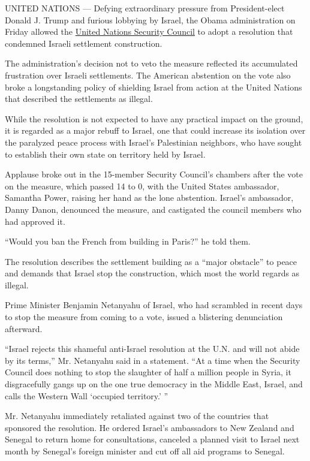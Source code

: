 UNITED NATIONS --- Defying extraordinary pressure from President-elect
Donald J. Trump and furious lobbying by Israel, the Obama administration
on Friday allowed the \href{http://www.un.org/en/sc/}{United Nations
Security Council} to adopt a resolution that condemned Israeli
settlement construction.

The administration's decision not to veto the measure reflected its
accumulated frustration over Israeli settlements. The American
abstention on the vote also broke a longstanding policy of shielding
Israel from action at the United Nations that described the settlements
as illegal.

While the resolution is not expected to have any practical impact on the
ground, it is regarded as a major rebuff to Israel, one that could
increase its isolation over the paralyzed peace process with Israel's
Palestinian neighbors, who have sought to establish their own state on
territory held by Israel.

Applause broke out in the 15-member Security Council's chambers after
the vote on the measure, which passed 14 to 0, with the United States
ambassador, Samantha Power, raising her hand as the lone abstention.
Israel's ambassador, Danny Danon, denounced the measure, and castigated
the council members who had approved it.

``Would you ban the French from building in Paris?'' he told them.

The resolution describes the settlement building as a ``major obstacle''
to peace and demands that Israel stop the construction, which most the
world regards as illegal.

Prime Minister Benjamin Netanyahu of Israel, who had scrambled in recent
days to stop the measure from coming to a vote, issued a blistering
denunciation afterward.

``Israel rejects this shameful anti-Israel resolution at the U.N. and
will not abide by its terms,'' Mr. Netanyahu said in a statement. ``At a
time when the Security Council does nothing to stop the slaughter of
half a million people in Syria, it disgracefully gangs up on the one
true democracy in the Middle East, Israel, and calls the Western Wall
`occupied territory.' ''

Mr. Netanyahu immediately retaliated against two of the countries that
sponsored the resolution. He ordered Israel's ambassadors to New Zealand
and Senegal to return home for consultations, canceled a planned visit
to Israel next month by Senegal's foreign minister and cut off all aid
programs to Senegal.

